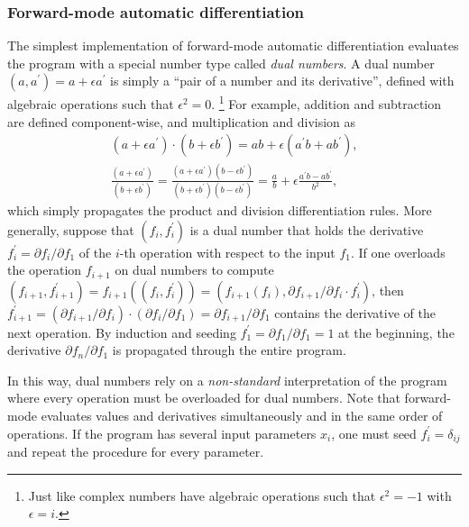 \documentclass{aa}
\begin{document}
\iffalse
\subsubsection{Forward-mode automatic differentiation}

The simplest implementation of forward-mode automatic differentiation evaluates the program with a special number type called \emph{dual numbers}.
A dual number $(a, a^\prime) = a + \epsilon a^\prime$ is simply a \enquote{pair of a number and its derivative}, defined with algebraic operations such that $\epsilon^2 = 0$.%
\footnote{Just like complex numbers have algebraic operations such that $\epsilon^2 = -1$ with $\epsilon = i$.}
For example, addition and subtraction are defined component-wise, and multiplication and division as
\begin{equation}
\begin{gathered}
    (a + \epsilon a^\prime) \cdot (b + \epsilon b^\prime) = ab + \epsilon(a^\prime b + a b^\prime), \\
    \frac{(a + \epsilon a^\prime)}{(b + \epsilon b^\prime)} = \frac{(a+\epsilon a^\prime)(b-\epsilon b^\prime)}{(b+\epsilon b^\prime)(b - \epsilon b^\prime)} = \frac{a}{b} + \epsilon \frac{a^\prime b - a b^\prime}{b^2},
\end{gathered}
\end{equation}
which simply propagates the product and division differentiation rules.
More generally, suppose that $(f_i, f_i^\prime)$ is a dual number that holds the derivative $f_i^\prime = \partial f_i / \partial f_1$ of the $i$-th operation with respect to the input $f_1$.
If one overloads the operation $f_{i+1}$ on dual numbers to compute $(f_{i+1}, f_{i+1}^\prime) = f_{i+1}((f_i, f_i^\prime)) = (f_{i+1}(f_i), \partial f_{i+1} / \partial f_i \cdot f_i^\prime )$,
then $f_{i+1}^\prime = (\partial f_{i+1} / \partial f_i) \cdot (\partial f_i / \partial f_1) = \partial f_{i+1}/\partial f_1$ contains the derivative of the next operation.
By induction and seeding $f_1^\prime = \partial f_1 / \partial f_1 = 1$ at the beginning, the derivative $\partial f_n / \partial f_1$ is propagated through the entire program.

In this way, dual numbers rely on a \textit{non-standard} interpretation of the program where every operation must be overloaded for dual numbers.
Note that forward-mode evaluates values and derivatives simultaneously and in the same order of operations.
If the program has several input parameters $x_i$, one must seed $f_i^\prime = \delta_{ij}$ and repeat the procedure for every parameter.
\end{document}
